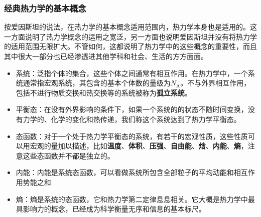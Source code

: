 \subsubsection{经典热力学的基本概念}
\qquad 按爱因斯坦的说法，在热力学的基本概念适用范围内，热力学本身也是适用的。这一方面说明了热力学概念的运用之宽泛，另一方面也说明爱因斯坦并没有将热力学的适用范围无限扩大。不管如何，这都说明了热力学中的这些概念的重要性，而且其中很大一部分也已经渗透进其他学科和社会、生活的方方面面。
\begin{itemize}
    \item 系统\cite{Wu2010}：泛指个体的集合，这些个体之间通常有相互作用。在热力学中，一个系统通常指宏观系统，其包含的基本个体数的量级为$N_{\mathrm{A}}$。不与外界相互作用，包括不进行物质交换和热交换等的系统被称为\textbf{孤立系统}。
    \item 平衡态：在没有外界影响的条件下，如果一个系统的的状态不随时间变换，没有力学的、化学的变化和热传递，我们称这个系统达到了热力学平衡态。
    \item 态函数：对于一个处于热力学平衡态的系统，有若干的宏观性质，这些性质可以用宏观的量加以描述，比如\textbf{温度}、\textbf{体积}、\textbf{压强}、\textbf{自由能}、\textbf{焓}、\textbf{内能}、\textbf{熵}，注意这些态函数并不都是独立的。
    \item 内能：内能是系统态函数，可以看做系统所包含全部粒子的平均动能和相互作用势能之和
    \item 熵：熵是系统的态函数，它和热力学第二定律息息相关。它大概是热力学中最具影响力的概念，已经成为科学衡量无序和信息的基本标尺。
\end{itemize}

